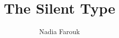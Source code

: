 
\title[The Silent Type]{The Silent Type}
\author{Nadia Farouk}

\newcommand{\uaffiliation}{}
\newcommand{\upublisher}{}
\newcommand{\uisbn}{}
\newcommand{\uedition}{1}
\newcommand{\urevision}{1}
\newcommand{\uvolume}{1}
\newcommand{\udate}{2026}

